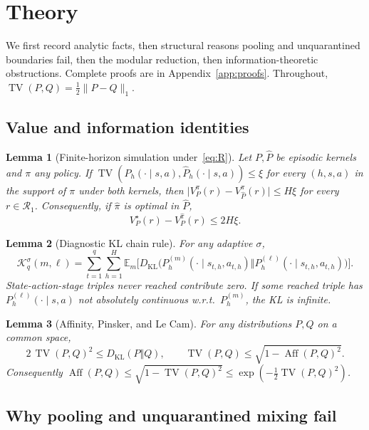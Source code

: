\documentclass[11pt]{article}
\newtheorem{lemma}{Lemma}
\newcommand{\Rone}{\mathcal{R}_1}
\newcommand{\Aff}{\operatorname{Aff}}
\newcommand{\TV}{\operatorname{TV}}
\newcommand{\KL}{D_{\mathrm{KL}}}
\newcommand{\E}{\mathbb{E}}
\begin{document}
\section{Theory}
\label{sec:theory}

We first record analytic facts, then structural reasons pooling and
unquarantined boundaries fail, then the modular reduction, then
information-theoretic obstructions. Complete proofs are in
Appendix~\ref{app:proofs}. Throughout, $\TV(P,Q)=\tfrac12\|P-Q\|_1$.

\subsection{Value and information identities}

\begin{lemma}[Finite-horizon simulation under~\eqref{eq:R}]
\label{lem:sim}
Let $P,\widehat P$ be episodic kernels and $\pi$ any policy. If
$\TV(P_h(\cdot\mid s,a),\widehat P_h(\cdot\mid s,a))\le\xi$ for every
$(h,s,a)$ in the support of $\pi$ under both kernels, then
$\bigl|V_P^\pi(r)-V_{\widehat P}^\pi(r)\bigr|\le H\xi$
for every $r\in\Rone$. Consequently, if $\widehat\pi$ is optimal in
$\widehat P$,
\[
V_P^\star(r)-V_P^{\widehat\pi}(r)\le 2H\xi.
\]
\end{lemma}

\begin{lemma}[Diagnostic KL chain rule]
\label{lem:chain}
For any adaptive $\sigma$,
\[
\mathcal{K}_q^\sigma(m,\ell)
=\sum_{t=1}^q\sum_{h=1}^H
\E_m\bigl[\KL\bigl(P_h^{(m)}(\cdot\mid s_{t,h},a_{t,h})
\Vert P_h^{(\ell)}(\cdot\mid s_{t,h},a_{t,h})\bigr)\bigr].
\]
State-action-stage triples never reached contribute zero. If some reached
triple has $P_h^{(\ell)}(\cdot\mid s,a)$ not absolutely continuous w.r.t.\
$P_h^{(m)}$, the KL is infinite.
\end{lemma}

\begin{lemma}[Affinity, Pinsker, and Le Cam]
\label{lem:info}
For any distributions $P,Q$ on a common space,
\[
2\,\TV(P,Q)^2\le \KL(P\Vert Q),
\qquad
\TV(P,Q)\le \sqrt{1-\Aff(P,Q)^2}.
\]
Consequently $\Aff(P,Q)\le \sqrt{1-\TV(P,Q)^2}\le \exp(-\tfrac12\TV(P,Q)^2)$.
\end{lemma}

\subsection{Why pooling and unquarantined mixing fail}
\end{document}
